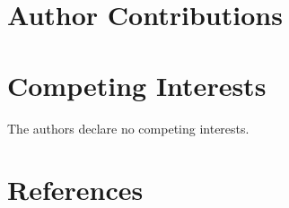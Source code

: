 \documentclass[
  letterpaper,
  DIV=11,
  numbers=noendperiod]{scrartcl}
\begin{document}
\hypertarget{author-contributions}{%
\section{Author Contributions}\label{author-contributions}}

\hypertarget{competing-interests}{%
\section{Competing Interests}\label{competing-interests}}

The authors declare no competing interests.

\hypertarget{references}{%
\section*{References}\label{references}}
\end{document}
